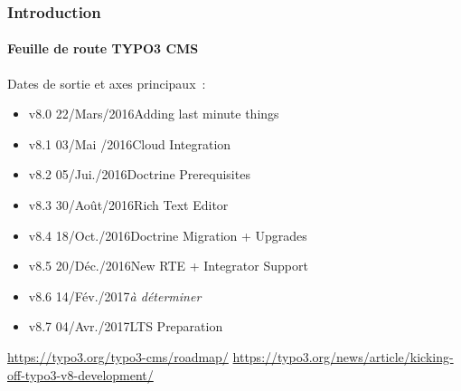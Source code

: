 \begin{frame}[fragile]
	\frametitle{Introduction}
	\framesubtitle{Feuille de route TYPO3 CMS}

	Dates de sortie et axes principaux~:

	\begin{itemize}

		\item v8.0 \tabto{1.1cm}22/Mars/2016\tabto{3.4cm}Adding last minute things
		\item v8.1 \tabto{1.1cm}03/Mai /2016\tabto{3.4cm}Cloud Integration
		\item v8.2 \tabto{1.1cm}05/Jui./2016\tabto{3.4cm}Doctrine Prerequisites
		\item v8.3 \tabto{1.1cm}30/Août/2016\tabto{3.4cm}Rich Text Editor
		\item v8.4 \tabto{1.1cm}18/Oct./2016\tabto{3.4cm}Doctrine Migration + Upgrades
		\item
			\begingroup
				\color{typo3orange}
					v8.5 \tabto{1.1cm}20/Déc./2016\tabto{3.4cm}New RTE + Integrator Support
			\endgroup
		\item v8.6 \tabto{1.1cm}14/Fév./2017\tabto{3.4cm}\textit{à déterminer}
		\item v8.7 \tabto{1.1cm}04/Avr./2017\tabto{3.4cm}LTS Preparation

	\end{itemize}

	\smaller
		\url{https://typo3.org/typo3-cms/roadmap/}\newline
		\url{https://typo3.org/news/article/kicking-off-typo3-v8-development/}
	\normalsize

\end{frame}

